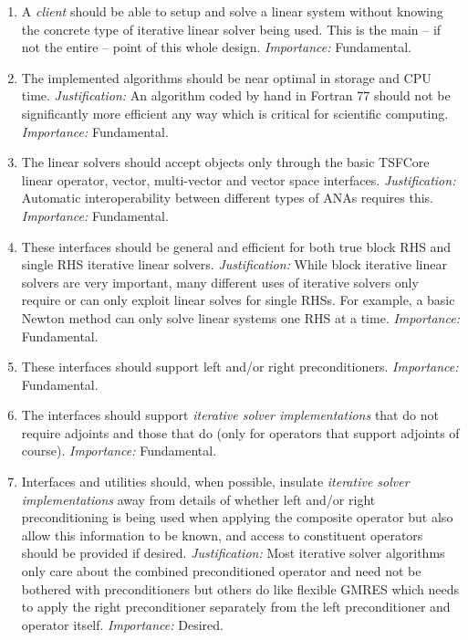 \documentclass[pdf,ps2pdf,11pt]{SANDreport}
\begin{document}
\begin{enumerate}

\item
A {}\textit{client} should be able to setup and solve a linear system
without knowing the concrete type of iterative linear solver being
used.  This is the main -- if not the entire -- point of this whole
design.  {}\textit{Importance:} Fundamental.

\item
The implemented algorithms should be near optimal in storage and CPU
time.  {}\textit{Justification:} An algorithm coded by hand in Fortran
77 should not be significantly more efficient any way which is
critical for scientific computing.  {}\textit{Importance:}
Fundamental.

\item
The linear solvers should accept objects only through the basic
TSFCore linear operator, vector, multi-vector and vector space
interfaces.  {}\textit{Justification:} Automatic interoperability
between different types of ANAs requires this.  {}\textit{Importance:}
Fundamental.

\item
These interfaces should be general and efficient for both true block
RHS and single RHS iterative linear solvers.
{}\textit{Justification:} While block iterative linear solvers are
very important, many different uses of iterative solvers only require
or can only exploit linear solves for single RHSs.  For example, a
basic Newton method can only solve linear systems one RHS at a time.
{}\textit{Importance:} Fundamental.

\item
These interfaces should support left and/or right preconditioners.
{}\textit{Importance:} Fundamental.

\item
The interfaces should support {}\textit{iterative solver
implementations} that do not require adjoints and those that do (only
for operators that support adjoints of course).
{}\textit{Importance:} Fundamental.

\item
Interfaces and utilities should, when possible, insulate
{}\textit{iterative solver implementations} away from details of
whether left and/or right preconditioning is being used when applying
the composite operator but also allow this information to be known,
and access to constituent operators should be provided if desired.
{}\textit{Justification:} Most iterative solver algorithms only care
about the combined preconditioned operator and need not be bothered
with preconditioners but others do like flexible GMRES which needs to
apply the right preconditioner separately from the left preconditioner
and operator itself.  {}\textit{Importance:} Desired.


\end{enumerate}
\end{document}
